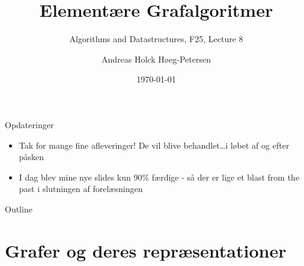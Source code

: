 \documentclass[aspectratio=1610]{beamer}
\title[ALG25 - Lecture 8]
{Elementære Grafalgoritmer}
\subtitle
{Algorithms and Datastructures, F25, Lecture 8}
\author[Andreas H. Høeg-Petersen]
{Andreas Holck Høeg-Petersen}
\institute[AAU]{%
  Department of Computer Science\\
  Aalborg University
}
\date {\today}
\begin{document}
\begin{frame}
  \titlepage
\end{frame}

\begin{frame}{Opdateringer}{}
    \begin{itemize}[<+->]
        \small
        \item Tak for mange fine afleveringer! De vil blive behandlet\ldots i
            løbet af og efter påsken
        \item I dag blev mine nye slides kun 90\% færdige - så der er lige et
            blast from the past i slutningen af forelæsningen 
    \end{itemize}
\end{frame}


\begin{frame}{Outline}
  \tableofcontents
\end{frame}

\section{Grafer og deres repræsentationer}
\end{document}
